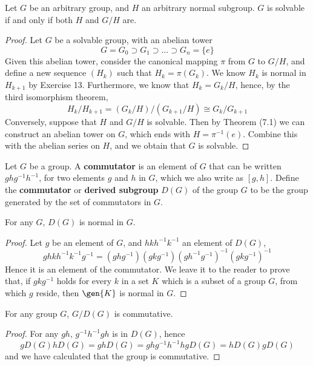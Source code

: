 \begin{theorem}
    Let $G$ be an arbitrary group, and $H$ an arbitrary normal subgroup. $G$ is solvable if and only if both $H$ and $G/H$ are.
\end{theorem}
\begin{proof}
    Let $G$ be a solvable group, with an abelian tower
    \[ G = G_0 \supset G_1 \supset \dots \supset G_n = \{ e \} \]
    Given this abelian tower, consider the canonical mapping $\pi$ from $G$ to $G/H$, and define a new sequence $(H_k)$ such that $H_k = \pi(G_k)$. We know $H_k$ is normal in $H_{k+1}$ by Exercise 13. Furthermore, we know that $H_k = G_k/H$, hence, by the third isomorphism theorem,
    \[ H_k/H_{k+1} = (G_k/H)/(G_{k+1}/H) \cong G_k/G_{k+1} \]
    Conversely, suppose that $H$ and $G/H$ is solvable. Then by Theorem (7.1) we can construct an abelian tower on $G$, which ends with $H = \pi^{-1}(e)$. Combine this with the abelian series on $H$, and we obtain that $G$ is solvable.
\end{proof}

\begin{definition}
    Let $G$ be a group. A {\bf commutator} is an element of $G$ that can be written $ghg^{-1}h^{-1}$, for two elements $g$ and $h$ in $G$, which we also write as $[g,h]$. Define the {\bf commutator} or {\bf derived subgroup} $D(G)$ of the group $G$ to be the group generated by the set of commutators in $G$.
\end{definition}

\begin{lemma}
    For any $G$, $D(G)$ is normal in $G$.
\end{lemma}
\begin{proof}
    Let $g$ be an element of $G$, and $hkh^{-1}k^{-1}$ an element of $D(G)$,
    \[ ghkh^{-1}k^{-1}g^{-1} = (ghg^{-1})(gkg^{-1})(gh^{-1}g^{-1})^{-1}(gkg^{-1})^{-1} \]
    Hence it is an element of the commutator. We leave it to the reader to prove that, if $gkg^{-1}$ holds for every $k$ in a set $K$ which is a subset of a group $G$, from which $g$ reside, then $\gen{K}$ is normal in $G$.
\end{proof}

\begin{lemma}
    For any group $G$, $G/D(G)$ is commutative.
\end{lemma}
\begin{proof}
    For any $gh$, $g^{-1}h^{-1}gh$ is in $D(G)$, hence
    \[ gD(G)hD(G) = ghD(G) = ghg^{-1}h^{-1}hgD(G) = hD(G)gD(G) \]
    and we have calculated that the group is commutative.
\end{proof}

